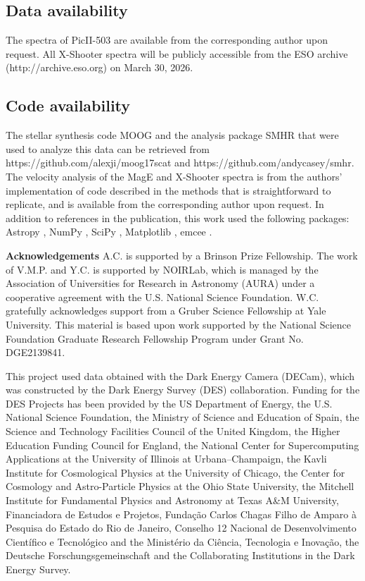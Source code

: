 \documentclass[pdflatex,sn-nature]{sn-jnl}%
\theoremstyle{thmstyleone}%
\theoremstyle{thmstyletwo}%
\theoremstyle{thmstylethree}%
\begin{document}
\subsection*{Data availability} 
The spectra of PicII-503 are available from the corresponding author upon request. 
All X-Shooter spectra will be publicly accessible from the ESO archive (http://archive.eso.org) on March 30, 2026.

\subsection*{Code availability} The stellar synthesis code MOOG and the analysis package SMHR that were used to analyze this data can be retrieved from https://github.com/alexji/moog17scat and https://github.com/andycasey/smhr. 
The velocity analysis of the MagE and X-Shooter spectra is from the authors' implementation of code described in the methods that is straightforward to replicate, and is available from the corresponding author upon request. 
In addition to references in the publication, this work used the following packages: Astropy \cite{astropy, astropy2}, NumPy \cite{numpy}, SciPy \cite{scipy}, Matplotlib \citep{Hunter+07}, emcee \citep{emcee1, emcee2}.

\textbf{Acknowledgements} 
A.C. is supported by a Brinson Prize Fellowship.
The work of V.M.P. and Y.C. is supported by NOIRLab, which is managed by the Association of Universities for Research in Astronomy (AURA) under a cooperative agreement with the U.S. National Science Foundation. W.C. gratefully acknowledges support from a Gruber Science Fellowship at Yale University.  This material is based upon work supported by the National Science Foundation Graduate
Research Fellowship Program under Grant No. DGE2139841. 



This project used data obtained with the Dark Energy Camera (DECam), which was constructed by the Dark Energy Survey (DES) collaboration. 
Funding for the DES Projects has been provided by the US Department of Energy, the U.S. National Science Foundation, the Ministry of Science and Education of Spain, the Science and Technology Facilities Council of the United Kingdom, the Higher Education Funding Council for England, the National Center for Supercomputing Applications at the University of Illinois at Urbana–Champaign, the Kavli Institute for Cosmological Physics at the University of Chicago, the Center for Cosmology and Astro-Particle Physics at the Ohio State University, the Mitchell Institute for Fundamental Physics and Astronomy at Texas A\&M University, Financiadora de Estudos e Projetos, Fundação Carlos Chagas Filho de Amparo à Pesquisa do Estado do Rio de Janeiro, Conselho 12 Nacional de Desenvolvimento Científico e Tecnológico and the Ministério da Ciência, Tecnologia e Inovação, the Deutsche Forschungsgemeinschaft and the Collaborating Institutions in the Dark Energy Survey.
\end{document}

